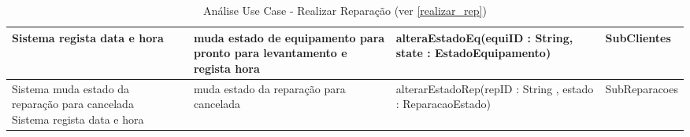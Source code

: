 \documentclass[../relatorio.tex]{subfiles}
\begin{document}
\begin{landscape}
\begin{table}[!h]
\begin{tabular}{|p{5cm}|p{1cm}|p{4cm}|p{6cm}|p{3cm}|}
            Sistema regista data e hora
                     & 
                     & muda estado de equipamento para pronto para levantamento e regista hora
                     & alteraEstadoEq(equiID : String, state : EstadoEquipamento)
                     & SubClientes
            \\
            \hline
            Sistema muda estado da reparação para cancelada
            Sistema regista data e hora
                     & 
                     & muda estado da reparação para cancelada
                     & alterarEstadoRep(repID : String , estado : ReparacaoEstado)
                     & SubReparacoes
            \\
            \hline
        \end{tabular}
        \caption{Análise Use Case - Realizar Reparação (ver \ref{realizar_rep})}
    \end{table}
\end{landscape}
\end{document}
